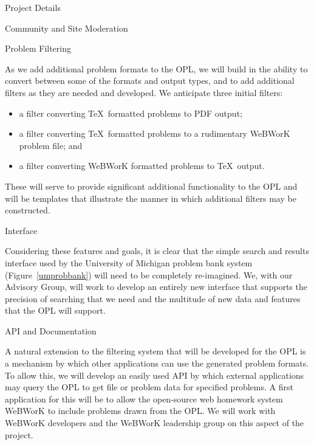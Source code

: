 \documentclass[11pt]{article}
\begin{document}
\begin{section}{Project Details}
\begin{subsection}{Community and Site Moderation}
\end{subsection}

\begin{subsection}{Problem Filtering}

As we add additional problem formats to the OPL, we will build in the
ability to convert between some of the formats and output types, and to
add additional filters as they are needed and developed. We anticipate
three initial filters:
\begin{itemize}
  \item
    a filter converting \TeX\ formatted problems to PDF output;
  \item
    a filter converting \TeX\ formatted problems to a rudimentary WeBWorK
    problem file; and
  \item
    a filter converting WeBWorK formatted problems to \TeX\ output. 
\end{itemize}
These will serve to provide significant additional functionality to the
OPL and will be templates that illustrate the manner in which additional
filters may be constructed.

\end{subsection}

\begin{subsection}{Interface}

Considering these features and goals, it is clear that the simple search
and results interface used by the University of Michigan problem bank
system (Figure~\ref{umprobbank}) will need to be completely re-imagined.
We, with our Advisory Group, will work to develop an entirely new
interface that supports the precision of searching that we need and the
multitude of new data and features that the OPL will support.

\end{subsection}

\begin{subsection}{API and Documentation}

A natural extension to the filtering system that will be developed for the
OPL is a mechanism by which other applications can use the generated
problem formats. To allow this, we will develop an easily used API by
which external applications may query the OPL to get file or problem data
for specified problems. A first application for this will be to allow the
open-source web homework system WeBWorK to include problems drawn from the
OPL.  We will work with WeBWorK developers and the WeBWorK leadership
group on this aspect of the project.

\end{subsection}

\end{section}
\end{document}
